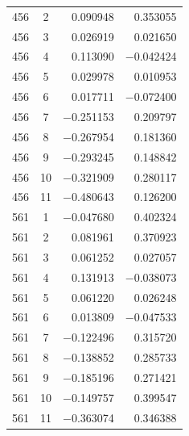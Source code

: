 \documentclass[12pt,a4paper,twoside]{article}
\numberwithin{equation}{section}
\begin{document}
{\begin{longtable}{cc rr}
    456 & 2 & 0.090948 & 0.353055 \\
    456 & 3 & 0.026919 & 0.021650 \\
    456 & 4 & 0.113090 & \ensuremath{-}0.042424 \\
    456 & 5 & 0.029978 & 0.010953 \\
    456 & 6 & 0.017711 & \ensuremath{-}0.072400 \\
    456 & 7 & \ensuremath{-}0.251153 & 0.209797 \\
    456 & 8 & \ensuremath{-}0.267954 & 0.181360 \\
    456 & 9 & \ensuremath{-}0.293245 & 0.148842 \\
    456 & 10 & \ensuremath{-}0.321909 & 0.280117 \\
    456 & 11 & \ensuremath{-}0.480643 & 0.126200 \\
    561 & 1 & \ensuremath{-}0.047680 & 0.402324 \\
    561 & 2 & 0.081961 & 0.370923 \\
    561 & 3 & 0.061252 & 0.027057 \\
    561 & 4 & 0.131913 & \ensuremath{-}0.038073 \\
    561 & 5 & 0.061220 & 0.026248 \\
    561 & 6 & 0.013809 & \ensuremath{-}0.047533 \\
    561 & 7 & \ensuremath{-}0.122496 & 0.315720 \\
    561 & 8 & \ensuremath{-}0.138852 & 0.285733 \\
    561 & 9 & \ensuremath{-}0.185196 & 0.271421 \\
    561 & 10 & \ensuremath{-}0.149757 & 0.399547 \\
    561 & 11 & \ensuremath{-}0.363074 & 0.346388 \\
\end{longtable}
}


\clearpage
\printbibliography[heading=bibintoc,title={Referências}]
\end{document}
